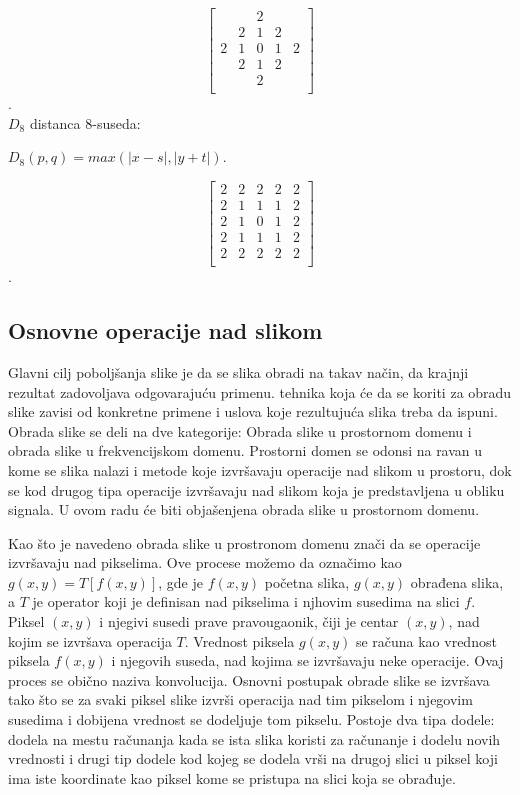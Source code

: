 \documentclass[a4paper,12pt,titlepage]{article}
\begin{document}
\[
\begin{bmatrix}
     &  & 2 &   &  \\
     & 2 & 1 & 2  &  \\
     2 & 1 & 0 & 1 & 2 \\
     & 2 & 1 & 2  &  \\
     &  & 2 &   &  \\
\end{bmatrix}
\].\\

$D_{8}$ distanca 8-suseda:

\begin{center}
$D_{8}(p, q) = max(|x - s|, |y + t|).$
\end{center} 

\[
\begin{bmatrix}
     2 & 2 & 2 & 2  & 2 \\
     2 & 1 & 1 & 1  & 2 \\
     2 & 1 & 0 & 1 & 2 \\
     2 & 1 & 1 & 1  & 2 \\
     2 & 2 & 2 & 2  & 2 \\
\end{bmatrix}
\].\\

\subsection{Osnovne operacije nad slikom}%

Glavni cilj poboljšanja slike je da se slika obradi na takav način, da krajnji rezultat zadovoljava odgovarajuću primenu. tehnika koja će da se koriti za obradu slike zavisi od konkretne primene i uslova koje rezultujuća slika treba da ispuni. Obrada slike se deli na dve kategorije: Obrada slike u prostornom domenu i obrada slike u frekvencijskom domenu. Prostorni domen se odonsi na ravan u kome se slika nalazi i metode koje izvršavaju operacije nad slikom u prostoru, dok se kod drugog tipa operacije izvršavaju nad slikom koja je predstavljena u obliku signala. U ovom radu će biti objašenjena obrada slike u prostornom domenu.

Kao što je navedeno obrada slike u prostronom domenu znači da se operacije izvršavaju nad pikselima. Ove procese možemo da označimo kao $g(x, y) = T[f(x, y)]$, gde je $f(x, y)$ početna slika, $g(x, y)$ obrađena slika, a $T$ je operator koji je definisan nad pikselima i njhovim susedima na slici $f$. Piksel $(x, y)$ i njegivi susedi prave pravougaonik, čiji je centar $(x, y)$, nad kojim se izvršava operacija $T$. Vrednost piksela $g(x, y)$ se računa kao vrednost piksela $f(x, y)$ i njegovih suseda, nad kojima se izvršavaju neke operacije. Ovaj proces se obično naziva konvolucija. Osnovni postupak obrade slike se izvršava tako što se za svaki piksel slike izvrši operacija nad tim pikselom i njegovim susedima i dobijena vrednost se dodeljuje tom pikselu. Postoje dva tipa dodele: dodela na mestu računanja kada se ista slika koristi za računanje i dodelu novih vrednosti i drugi tip dodele kod kojeg se dodela vrši na drugoj slici u piksel koji ima iste koordinate kao piksel kome se pristupa na slici koja se obrađuje.   
\end{document}
